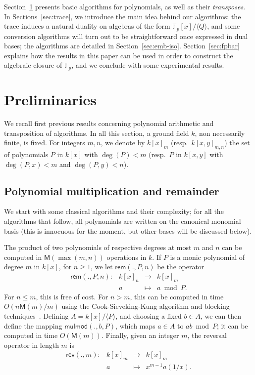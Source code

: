 \documentclass{sig-alternate}
\def\M {\ensuremath{\mathsf{M}}}
\def\F {\ensuremath{\mathbb{F}}}
\def\rem {\ensuremath{\mathsf{rem}}}
\def\mulmod {\ensuremath{\mathsf{mulmod}}}
\def\rev {\ensuremath{\mathsf{rev}}}
\newcounter{algo}
\newcommand{\ang}[1]{\langle#1\rangle}
\begin{document}
  Section~\ref{sec:prelim} presents basic
algorithms for polynomials, as well as their {\em transposes}.  In
Sections~\ref{sec:trace}, we introduce the main idea behind our
algorithms: the trace induces a natural duality on algebras of the
form $\F_p[x]/\ang{Q}$, and some conversion algorithms will turn out
to be straightforward once expressed in dual bases; the algorithms are
detailed in Section~\ref{sec:emb-iso}. Section~\ref{sec:fpbar}
explains how the results in this paper can be used in order to
construct the algebraic closure of $\F_p$, and we conclude with some
experimental results.


\section{Preliminaries}\label{sec:prelim}

We recall first previous results concerning polynomial arithmetic and
transposition of algorithms. In all this section, a ground field $k$,
non necessarily finite, is fixed. For integers $m,n$, we denote by
$k[x]_m$ (resp.\ $k[x,y]_{m,n}$) the set of polynomials $P$ in $k[x]$
with $\deg(P) <m$ (resp.\ $P$ in $k[x,y]$ with $\deg(P,x) <m$ and
$\deg(P,y)<n$).


\subsection{Polynomial multiplication and remainder}

We start with some classical algorithms and their complexity; for all
the algorithms that follow, all polynomials are written on the
canonical monomial basis (this is innocuous for the moment, but other
bases will be discussed below).

The product of two polynomials of respective degrees at most $m$ and
$n$ can be computed in $\M(\max(m,n))$ operations in $k$.  If $P$ is a
monic polynomial of degree $m$ in $k[x]$, for $n \ge 1$, we let
$\rem(.,P,n)$ be the operator
$$
\begin{array}{cccc}
\rem(.,P,n): &k[x]_n& \to &k[x]_{m}\\
& a & \mapsto & a \bmod P.
\end{array}$$ 
For $n \le m$, this is free of cost. For $n > m$, this can be computed
in time $O(n\M(m)/m)$ using the Cook-Sieveking-Kung algorithm and
blocking techniques~\cite[Ch.~5.1.3]{Bostan10}. Defining
$A=k[x]/\ang{P}$, and choosing a fixed $b \in A$, we can then define
the mapping $\mulmod(.,b,P)$, which maps $a \in A$ to $ab \bmod P$; it
can be computed in time $O(\M(m))$. Finally, given an integer $m$, the
reversal operator in length $m$ is 
$$
\begin{array}{cccc}
\rev(.,m): &k[x]_m &\to& k[x]_m  \\
& a & \mapsto & x^{m-1} a(1/x).
\end{array}$$ 
\end{document}
